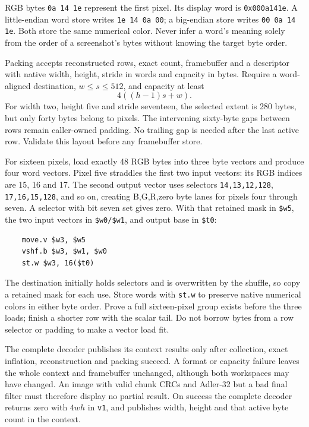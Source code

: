 RGB bytes \texttt{0a 14 1e} represent the first pixel. Its display word is
\texttt{0x000a141e}. A little-endian word store writes \texttt{1e 14 0a 00};
a big-endian store writes \texttt{00 0a 14 1e}. Both store the same numerical
color. Never infer a word's meaning solely from the order of a screenshot's
bytes without knowing the target byte order.

Packing accepts reconstructed rows, exact count, framebuffer and a descriptor
with native width, height, stride in words and capacity in bytes. Require a
word-aligned destination, $w\leq s\leq512$, and capacity at least
\[
  4((h-1)s+w).
\]
For width two, height five and stride seventeen, the selected extent is 280
bytes, but only forty bytes belong to pixels. The intervening sixty-byte gaps
between rows remain caller-owned padding. No trailing gap is needed after the
last active row. Validate this layout before any framebuffer store.

For sixteen pixels, load exactly 48 RGB bytes into three byte vectors and
produce four word vectors. Pixel five straddles the first two input vectors:
its RGB indices are 15, 16 and 17. The second output vector uses selectors
\texttt{14,13,12,128}, \texttt{17,16,15,128}, and so on, creating B,G,R,zero
byte lanes for pixels four through seven. A selector with bit seven set gives
zero. With that retained mask in \texttt{\$w5}, the two input vectors in
\texttt{\$w0/\$w1}, and output base in \texttt{\$t0}:
\begin{verbatim}
    move.v $w3, $w5
    vshf.b $w3, $w1, $w0
    st.w $w3, 16($t0)
\end{verbatim}
The destination initially holds selectors and is overwritten by the shuffle,
so copy a retained mask for each use. Store words with \texttt{st.w} to preserve
native numerical colors in either byte order. Prove a full sixteen-pixel group
exists before the three loads; finish a shorter row with the scalar tail.
Do not borrow bytes from a row selector or padding to make a vector load fit.


The complete decoder publishes its context results only after collection,
exact inflation, reconstruction and packing succeed. A format or capacity
failure leaves the whole context and framebuffer unchanged, although both
workspaces may have changed. An image with valid chunk CRCs and Adler-32 but
a bad final filter must therefore display no partial result. On success the
complete decoder returns zero with $4wh$ in \texttt{v1}, and publishes width,
height and that active byte count in the context.


